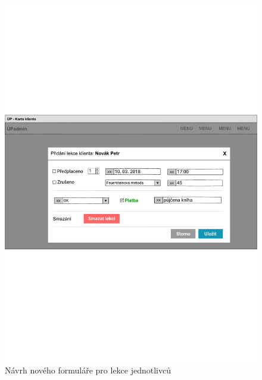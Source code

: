 \begin{figure}[ht]\centering
    \includegraphics[width=1\textwidth]{img/ui-lekce-klient}
    \caption{Návrh nového formuláře pro lekce jednotlivců}\label{fig:ui-lekce-klient}
\end{figure}


